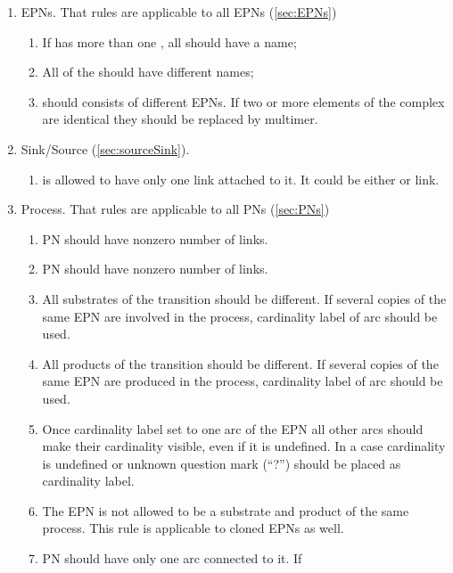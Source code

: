 \begin{enumerate}
  \item EPNs. That rules are applicable to all EPNs (\ref{sec:EPNs})
  \begin{enumerate}
    \item If  has more than one , 
    all  should have a name;
    \item All  of the  should have 
    different names;
    \item {} should consists of different EPNs. If two or more 
    elements of the complex are identical they should be replaced by multimer. 
  \end{enumerate}
  \item Sink/Source (\ref{sec:sourceSink}).
  \begin{enumerate}
    \item {} is allowed to have only one link attached to it. It
    could be either  or  link.
  \end{enumerate}
    \item Process. That rules are applicable to all PNs (\ref{sec:PNs})
  \begin{enumerate}
    \item PN should have nonzero number of  links.
    \item PN should have nonzero number of  links.
    \item All substrates of the transition should be different. If several 
    copies of the same EPN are involved in the process, cardinality label of 
     arc should be used.
    \item All products of the transition should be different. If several copies 
    of the same EPN are produced in the process, cardinality label of 
     arc should be used.
    \item Once cardinality label set to one arc of the EPN all other arcs should
    make their cardinality visible, even if it is undefined. In a case
    cardinality is undefined or unknown question mark (``?'') should be placed as cardinality label. 
    \item The EPN is not allowed to be a substrate and product of the same 
    process. This rule is applicable to cloned EPNs as well.
    \item PN should have only one  arc connected to it. If

\end{enumerate}
\end{enumerate}
